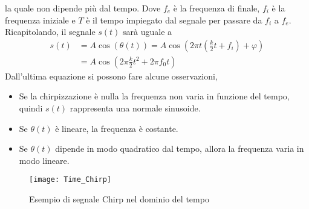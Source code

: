 la quale non dipende più dal tempo.  Dove $f_e$ è la frequenza di finale, $f_i$ è la
frequenza iniziale e $T$ è il tempo impiegato dal segnale per passare da $f_i$ a
$f_e$.
Ricapitolando, il segnale $s(t)$ sarà uguale a 
\begin{equation}
\begin{split}
        s(t) &=A\cos(\theta(t)) 
             =A\cos\left(2\pi t\left(\frac{k}{2}t+f_i\right) +
             \varphi\right)\\
             & = A\cos\left(2\pi\frac{k}{2}t^2+2\pi f_0 t\right)
\end{split}
\end{equation}
Dall'ultima equazione si possono fare alcune osservazioni, 
\begin{itemize}
        \item Se la chirpizzazione è nulla la frequenza non varia in funzione del
        tempo, quindi $s(t)$ rappresenta una normale sinusoide.
        \item Se $\theta(t)$ è lineare, la frequenza è costante. 
        \item Se $\theta(t)$ dipende in modo quadratico dal tempo, allora la
        frequenza varia in modo lineare.
\end{itemize}

\begin{figure}[h]
        \centering
                \texttt{[image: Time\_Chirp]}
        \caption{Esempio di segnale Chirp nel dominio del tempo}
\end{figure}

